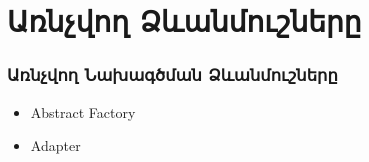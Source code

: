 \documentclass{beamer}
\begin{document}
\section{Առնչվող Ձևանմուշները}
\begin{frame}\frametitle{Առնչվող Նախագծման Ձևանմուշները}
\begin{itemize}
    \item Abstract Factory \vfill
    \item Adapter
\end{itemize}
\end{frame}
\end{document}
